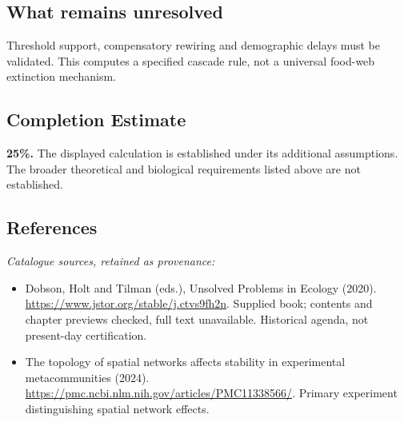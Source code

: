 \documentclass[11pt]{article}
\begin{document}
\subsection{What remains unresolved}
Threshold support, compensatory rewiring and demographic delays must be validated. This computes a specified cascade rule, not a universal food-web extinction mechanism.
\subsection{Completion Estimate}
\textbf{25\%.} The displayed calculation is established under its additional assumptions. The broader theoretical and biological requirements listed above are not established.
\subsection{References}
\noindent\emph{Catalogue sources, retained as provenance:}
\begin{itemize}
\item Dobson, Holt and Tilman (eds.), Unsolved Problems in Ecology (2020). \url{https://www.jstor.org/stable/j.ctvs9fh2n}. Supplied book; contents and chapter previews checked, full text unavailable. Historical agenda, not present-day certification.
\item The topology of spatial networks affects stability in experimental metacommunities (2024). \url{https://pmc.ncbi.nlm.nih.gov/articles/PMC11338566/}. Primary experiment distinguishing spatial network effects.
\end{itemize}
\end{document}
